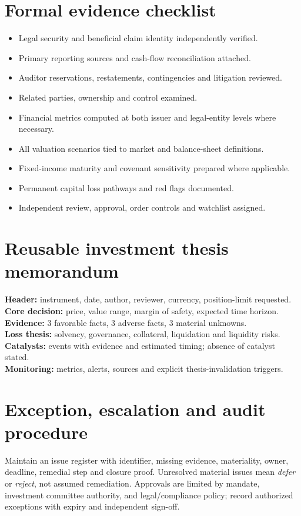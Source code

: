 \documentclass[11pt,letterpaper]{article}
\begin{document}
\section{Formal evidence checklist}
\begin{itemize}
\item[$\square$] Legal security and beneficial claim identity independently verified.
\item[$\square$] Primary reporting sources and cash-flow reconciliation attached.
\item[$\square$] Auditor reservations, restatements, contingencies and litigation reviewed.
\item[$\square$] Related parties, ownership and control examined.
\item[$\square$] Financial metrics computed at both issuer and legal-entity levels where necessary.
\item[$\square$] All valuation scenarios tied to market and balance-sheet definitions.
\item[$\square$] Fixed-income maturity and covenant sensitivity prepared where applicable.
\item[$\square$] Permanent capital loss pathways and red flags documented.
\item[$\square$] Independent review, approval, order controls and watchlist assigned.
\end{itemize}

\section{Reusable investment thesis memorandum}
\begin{methodbox}
\textbf{Header:} instrument, date, author, reviewer, currency, position-limit requested.\\
\textbf{Core decision:} price, value range, margin of safety, expected time horizon.\\
\textbf{Evidence:} 3 favorable facts, 3 adverse facts, 3 material unknowns.\\
\textbf{Loss thesis:} solvency, governance, collateral, liquidation and liquidity risks.\\
\textbf{Catalysts:} events with evidence and estimated timing; absence of catalyst stated.\\
\textbf{Monitoring:} metrics, alerts, sources and explicit thesis-invalidation triggers.
\end{methodbox}

\section{Exception, escalation and audit procedure}
Maintain an issue register with identifier, missing evidence, materiality, owner, deadline, remedial step and closure proof. Unresolved material issues mean \emph{defer} or \emph{reject}, not assumed remediation. Approvals are limited by mandate, investment committee authority, and legal/compliance policy; record authorized exceptions with expiry and independent sign-off.
\end{document}
